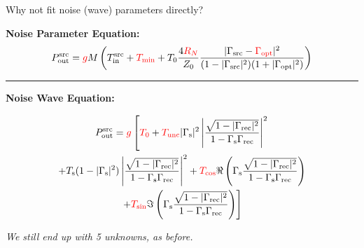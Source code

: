 \documentclass[aspectratio=169]{beamer}
\begin{document}
\begin{frame}{Why not fit noise (wave) parameters directly?}

	\textbf{\small{Noise Parameter Equation:}}
	{\tiny
		\begin{equation}
			P_{\text{out}}^{\text{src}} = \textcolor{red}{g} M \left( T_{\text{in}}^{\text{src}} + \textcolor{red}{T_{\text{min}}} + T_0 \frac{4\textcolor{red}{R_N}}{Z_0} \frac{|\Gamma_{\text{src}} - \textcolor{red}{\Gamma_{\text{opt}}}|^2}{(1 - |\Gamma_{\text{src}}|^2)(1 + |\Gamma_{\text{opt}}|^2)} \right)
		\end{equation}
	}

	\vspace{0.3cm}
	\hrule  %
	\vspace{0.3cm}

	\textbf{\small{Noise Wave Equation:}}

	{\tiny
		\begin{multline}\label{}
			P_{\text{out}}^{\text{src}} = \textcolor{red}{g} \left[ \textcolor{red}{T_0} + \textcolor{red}{T_{\text{unc}}} |\Gamma_{\text{s}}|^2 \left|\frac{ \sqrt{1 - |\Gamma_{\text{rec}}|^2}}{1 - \Gamma_{\text{s}}\Gamma_{\text{rec}}} \right|^2 \right. \\
				\left. + T_{\text{s}}(1 - |\Gamma_{\text{s}}|^2) \left|\frac{ \sqrt{1 - |\Gamma_{\text{rec}}|^2}}{1 - \Gamma_{\text{s}}\Gamma_{\text{rec}}} \right|^2 + \textcolor{red}{T_{\text{cos}}} \Re \left( \Gamma_{\text{s}} \frac{\sqrt{1 - |\Gamma_{\text{rec}}|^2}}{1 - \Gamma_{\text{s}} \Gamma_{\text{rec}}} \right) \right. \\
				\left. + \textcolor{red}{T_{\text{sin}}} \Im \left( \Gamma_{\text{s}} \frac{\sqrt{1 - |\Gamma_{\text{rec}}|^2}}{1 - \Gamma_{\text{s}} \Gamma_{\text{rec}}} \right) \right]
		\end{multline}
	}

	\textit{We still end up with 5 unknowns, as before.}

\end{frame}
\end{document}
